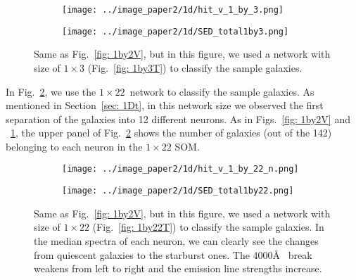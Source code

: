             \begin{figure}
                \begin{subfigure}[b]{\textwidth}
                    \centering
                    \texttt{[image: ../image\_paper2/1d/hit\_v\_1\_by\_3.png]}
                \end{subfigure}
                \hfill
                \begin{subfigure}[b]{\textwidth}
                     \texttt{[image: ../image\_paper2/1d/SED\_total1by3.png]}
                \end{subfigure}
                \caption[Classification of fitted galaxy SEDs from \citet{Hossein12} using the $1\times3$~networks]{Same as Fig.~\ref{fig: 1by2V}, but in this figure, we used a network with size of $1\times3$ (Fig.~\ref{fig: 1by3T}) to classify the sample galaxies.}
                \label{fig: 1by3V}
            \end{figure}       
            
            In Fig.~\ref{fig: 1by22V}, we use the $1\times22$~network to classify the sample galaxies.
            As mentioned in Section~\ref{sec: 1Dt}, in this network size we observed the first separation of the  galaxies into 12 different neurons.
           As in Figs.~\ref{fig: 1by2V} and ~\ref{fig: 1by3V}, the upper panel of Fig.~\ref{fig: 1by22V} shows the number of galaxies (out of the 142) belonging to each neuron in the $1\times22$ SOM.

            \begin{figure}
                \begin{subfigure}[b]{\textwidth}
                    \texttt{[image: ../image\_paper2/1d/hit\_v\_1\_by\_22\_n.png]}
                    \centering
                \end{subfigure}
                \hfill
                \begin{subfigure}[b]{\textwidth}
                \centering
                     \texttt{[image: ../image\_paper2/1d/SED\_total1by22.png]}
                \end{subfigure}
                \caption[Classification of fitted galaxy SEDs from \citet{Hossein12} using the $1\times22$~networks]{Same as Fig.~\ref{fig: 1by2V}, but in this figure, we used a network with size of $1\times22$ (Fig.~\ref{fig: 1by22T}) to classify the sample galaxies. In the median spectra of each neuron, we can clearly see the changes from quiescent galaxies to the starburst ones. The 4000\AA~ break weakens from left to right and the emission line strengths increase.}
                \label{fig: 1by22V}
            \end{figure}

